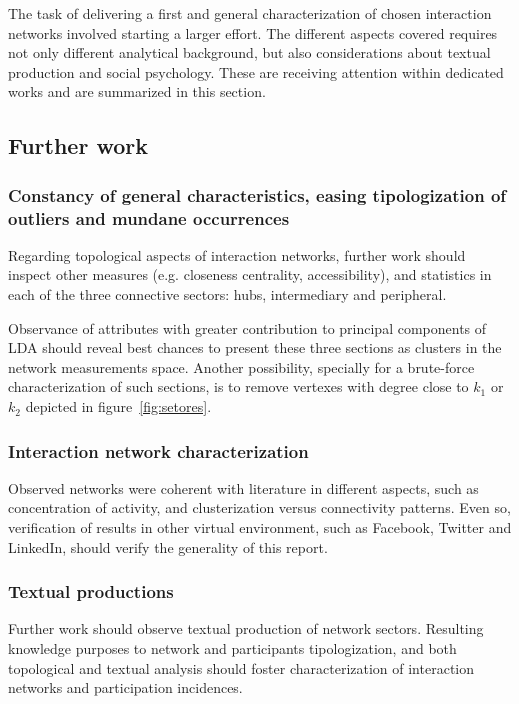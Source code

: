 \documentclass[%
 aip,
 jmp,%
 amsmath,amssymb,
 reprint,%
]{revtex4-1}
\begin{document}
The task of delivering a first and general characterization of chosen interaction networks involved starting a larger effort. The different aspects covered requires not only different analytical background, but also considerations about textual production and social psychology. These are receiving attention within dedicated works and are summarized in this section.

    \subsection{Further work}
        \subsubsection{Constancy of general characteristics, easing tipologization of outliers and mundane occurrences}

Regarding topological aspects of interaction networks, further work should inspect other measures (e.g. closeness centrality, accessibility), and statistics in each of the three connective sectors: hubs, intermediary and peripheral.

 Observance of attributes with greater contribution to principal components of LDA should reveal best chances to present these three sections as clusters in the network measurements space. Another possibility, specially for a brute-force characterization of such sections, is to remove vertexes with degree close to $k_1$ or $k_2$ depicted in figure~\ref{fig:setores}.


        \subsubsection{Interaction network characterization}

Observed networks were coherent with literature in different aspects, such as concentration of activity, and clusterization versus connectivity patterns. Even so, verification of results in other virtual environment, such as Facebook, Twitter and LinkedIn, should verify the generality of this report. 



        \subsubsection{Textual productions}
Further work should observe textual production of network sectors. Resulting knowledge purposes to network and participants tipologization, and both topological and textual analysis should foster characterization of interaction networks and participation incidences.
\end{document}

